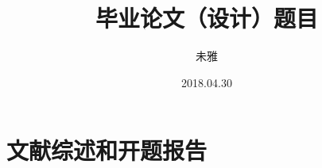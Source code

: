 \documentclass[fangfont=STFANGSO.TTF,heifont=simhei.ttf,blind]{zju-thesis}
\title{毕业论文（设计）题目}{浙江大学本科生毕业论文（设计）}
\author{未雅}{3140100000}
\date{2018.04.30}
\begin{document}
	\makecover
    \tableofcontents
	\begin{refsection}
	
	\end{refsection}
	
	
	\part{文献综述和开题报告}
	\renewcommand\thechapter{\zhnum{chapter}、} 
	
\end{document}
